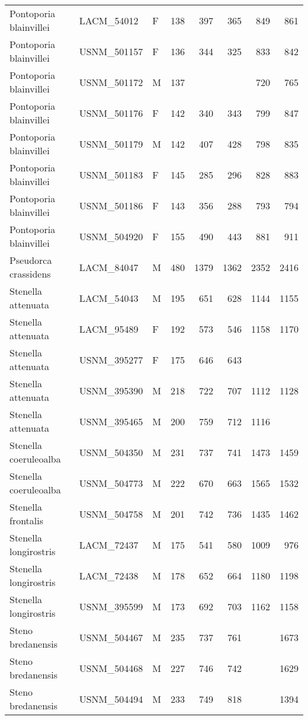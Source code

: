 \begin{table}[ht]
\begin{tabular}{lllrrrrr}
  Pontoporia blainvillei & LACM\_54012 & F & 138 & 397 & 365 & 849 & 861 \\ 
  Pontoporia blainvillei & USNM\_501157 & F & 136 & 344 & 325 & 833 & 842 \\ 
  Pontoporia blainvillei & USNM\_501172 & M & 137 &  &  & 720 & 765 \\ 
  Pontoporia blainvillei & USNM\_501176 & F & 142 & 340 & 343 & 799 & 847 \\ 
  Pontoporia blainvillei & USNM\_501179 & M & 142 & 407 & 428 & 798 & 835 \\ 
  Pontoporia blainvillei & USNM\_501183 & F & 145 & 285 & 296 & 828 & 883 \\ 
  Pontoporia blainvillei & USNM\_501186 & F & 143 & 356 & 288 & 793 & 794 \\ 
  Pontoporia blainvillei & USNM\_504920 & F & 155 & 490 & 443 & 881 & 911 \\ 
  Pseudorca crassidens & LACM\_84047 & M & 480 & 1379 & 1362 & 2352 & 2416 \\ 
  Stenella attenuata & LACM\_54043 & M & 195 & 651 & 628 & 1144 & 1155 \\ 
  Stenella attenuata & LACM\_95489 & F & 192 & 573 & 546 & 1158 & 1170 \\ 
  Stenella attenuata & USNM\_395277 & F & 175 & 646 & 643 &  &  \\ 
  Stenella attenuata & USNM\_395390 & M & 218 & 722 & 707 & 1112 & 1128 \\ 
  Stenella attenuata & USNM\_395465 & M & 200 & 759 & 712 & 1116 &  \\ 
  Stenella coeruleoalba & USNM\_504350 & M & 231 & 737 & 741 & 1473 & 1459 \\ 
  Stenella coeruleoalba & USNM\_504773 & M & 222 & 670 & 663 & 1565 & 1532 \\ 
  Stenella frontalis & USNM\_504758 & M & 201 & 742 & 736 & 1435 & 1462 \\ 
  Stenella longirostris & LACM\_72437 & M & 175 & 541 & 580 & 1009 & 976 \\ 
  Stenella longirostris & LACM\_72438 & M & 178 & 652 & 664 & 1180 & 1198 \\ 
  Stenella longirostris & USNM\_395599 & M & 173 & 692 & 703 & 1162 & 1158 \\ 
  Steno bredanensis & USNM\_504467 & M & 235 & 737 & 761 &  & 1673 \\ 
  Steno bredanensis & USNM\_504468 & M & 227 & 746 & 742 &  & 1629 \\ 
  Steno bredanensis & USNM\_504494 & M & 233 & 749 & 818 &  & 1394 \\ 

\end{tabular}
\end{table}
